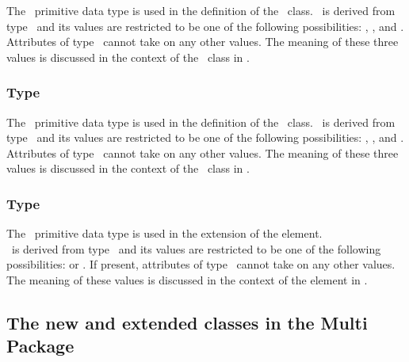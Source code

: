 The \BindingStatusPT\ primitive data type is used in the definition of the \OutwardBindingSite\ class.  \BindingStatusPT\ is derived from type \stringPT\ and its values are restricted to be one of the following possibilities: , , and .  Attributes of type \BindingStatusPT\ cannot take on any other values.  The meaning of these three values is discussed in the context of the \OutwardBindingSite\ class in .

\subsubsection{Type \RelationPT}
\label{def:Primtype:Relation}

The \RelationPT\ primitive data type is used in the definition of the \SubListOfSpeciesFeatures\ class. \RelationPT\ is derived from type \stringPT\ and its values are restricted to be one of the following possibilities: , , and . Attributes of type \RelationPT\ cannot take on any other values. The meaning of these three values is discussed in the context of the \SubListOfSpeciesFeatures\ class in .

\subsubsection{Type \RepresentationTypePT}
\label{def:Primtype:RepresentationType}

The \RepresentationTypePT\ primitive data type is used in the extension of the  element.\\ \RepresentationTypePT\ is derived from type \stringPT\ and its values are restricted to be one of the following possibilities:  or . If present, attributes of type \RepresentationTypePT\ cannot take on any other values. The meaning of these values is discussed in the context of the   element in .

\subsection{The new and extended classes in the Multi Package}
\label{def:NewClasses}

